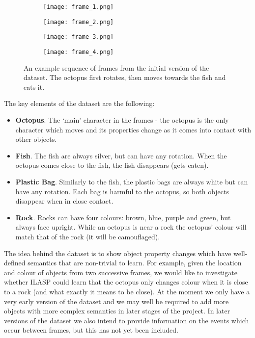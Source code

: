 \documentclass[../interim.tex]{subfiles}
\begin{document}
\begin{figure}[ht!]
  \begin{subfigure}{0.24\textwidth}
    \centering
    \texttt{[image: frame\_1.png]}
  \end{subfigure}
  \hfill
  \begin{subfigure}{0.24\textwidth}
    \centering
    \texttt{[image: frame\_2.png]}
  \end{subfigure}
  \hfill
  \begin{subfigure}{0.24\textwidth}
    \centering
    \texttt{[image: frame\_3.png]}
  \end{subfigure}
  \hfill
  \begin{subfigure}{0.24\textwidth}
    \centering
    \texttt{[image: frame\_4.png]}
  \end{subfigure}
  \caption{An example sequence of frames from the initial version of the dataset. The octopus first rotates, then moves towards the fish and eats it.}
  \label{fig:dataset-frames}
\end{figure}

The key elements of the dataset are the following:
\begin{itemize}
  \item \textbf{Octopus}. The `main' character in the frames - the octopus is the only character which moves and its properties change as it comes into contact with other objects.

  \item \textbf{Fish}. The fish are always silver, but can have any rotation. When the octopus comes close to the fish, the fish disappears (gets eaten).

  \item \textbf{Plastic Bag}. Similarly to the fish, the plastic bags are always white but can have any rotation. Each bag is harmful to the octopus, so both objects disappear when in close contact.

  \item \textbf{Rock}. Rocks can have four colours: brown, blue, purple and green, but always face upright. While an octopus is near a rock the octopus' colour will match that of the rock (it will be camouflaged).
\end{itemize}

The idea behind the dataset is to show object property changes which have well-defined semantics that are non-trivial to learn. For example, given the location and colour of objects from two successive frames, we would like to investigate whether ILASP could learn that the octopus only changes colour when it is close to a rock (and what exactly it means to be close). At the moment we only have a very early version of the dataset and we may well be required to add more objects with more complex semantics in later stages of the project. In later versions of the dataset we also intend to provide information on the events which occur between frames, but this has not yet been included.
\end{document}
